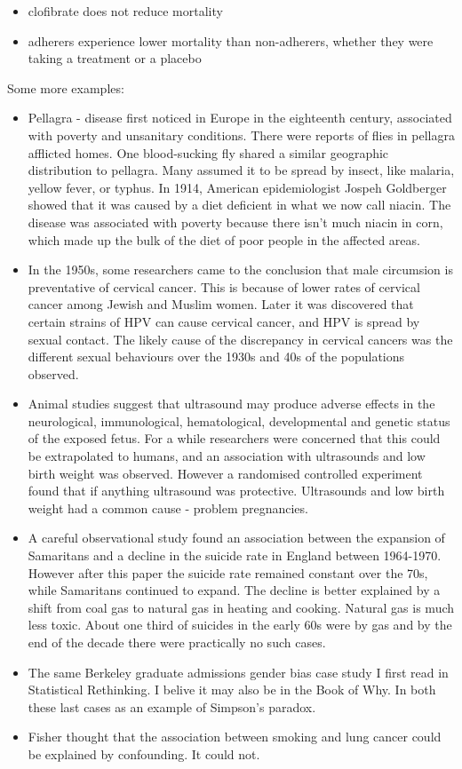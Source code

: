 \documentclass[
]{book}
\providecommand{\tightlist}{%
  \setlength{\itemsep}{0pt}\setlength{\parskip}{0pt}}
\begin{document}
\begin{itemize}
\tightlist
\item
  clofibrate does not reduce mortality
\item
  adherers experience lower mortality than non-adherers, whether they were taking a treatment or a placebo
\end{itemize}

Some more examples:

\begin{itemize}
\item
  Pellagra - disease first noticed in Europe in the eighteenth century, associated with poverty and unsanitary conditions. There were reports of flies in pellagra afflicted homes. One blood-sucking fly shared a similar geographic distribution to pellagra. Many assumed it to be spread by insect, like malaria, yellow fever, or typhus. In 1914, American epidemiologist Jospeh Goldberger showed that it was caused by a diet deficient in what we now call niacin. The disease was associated with poverty because there isn't much niacin in corn, which made up the bulk of the diet of poor people in the affected areas.
\item
  In the 1950s, some researchers came to the conclusion that male circumsion is preventative of cervical cancer. This is because of lower rates of cervical cancer among Jewish and Muslim women. Later it was discovered that certain strains of HPV can cause cervical cancer, and HPV is spread by sexual contact. The likely cause of the discrepancy in cervical cancers was the different sexual behaviours over the 1930s and 40s of the populations observed.
\item
  Animal studies suggest that ultrasound may produce adverse effects in the neurological, immunological, hematological, developmental and genetic status of the exposed fetus. For a while researchers were concerned that this could be extrapolated to humans, and an association with ultrasounds and low birth weight was observed. However a randomised controlled experiment found that if anything ultrasound was protective. Ultrasounds and low birth weight had a common cause - problem pregnancies.
\item
  A careful observational study found an association between the expansion of Samaritans and a decline in the suicide rate in England between 1964-1970. However after this paper the suicide rate remained constant over the 70s, while Samaritans continued to expand. The decline is better explained by a shift from coal gas to natural gas in heating and cooking. Natural gas is much less toxic. About one third of suicides in the early 60s were by gas and by the end of the decade there were practically no such cases.
\item
  The same Berkeley graduate admissions gender bias case study I first read in Statistical Rethinking. I belive it may also be in the Book of Why. In both these last cases as an example of Simpson's paradox.
\item
  Fisher thought that the association between smoking and lung cancer could be explained by confounding. It could not.
\end{itemize}
\end{document}
